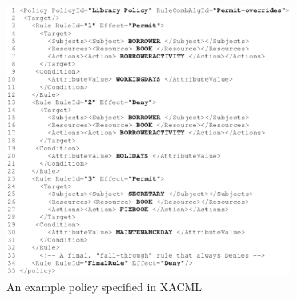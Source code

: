 \begin{figure}[t]
    \centering
        \includegraphics[width=3.7in]{example_policy.eps}
        \vspace{-5pt}
    \caption{\label{fig:example}An example policy specified in XACML}
    \vspace{-10pt}
\end{figure}
%
% 
